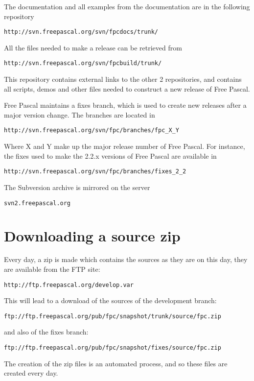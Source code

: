 The documentation and all examples from the documentation are in the
following repository
\begin{verbatim}
http://svn.freepascal.org/svn/fpcdocs/trunk/
\end{verbatim}

All the files needed to make a release can be retrieved from
\begin{verbatim}
http://svn.freepascal.org/svn/fpcbuild/trunk/
\end{verbatim}
This repository contains external links to the other 2 repositories, and
contains all scripts, demos and other files needed to construct a new
release of Free Pascal.

Free Pascal maintains a fixes branch, which is used to create new releases
after a major version change. The branches are located in 
\begin{verbatim}
http://svn.freepascal.org/svn/fpc/branches/fpc_X_Y
\end{verbatim}
Where X and Y make up the major release number of Free Pascal. 
For instance, the fixes used to make the 2.2.x versions of Free Pascal are
available in
\begin{verbatim}
http://svn.freepascal.org/svn/fpc/branches/fixes_2_2
\end{verbatim}

The Subversion archive is mirrored on the server
\begin{verbatim}
svn2.freepascal.org
\end{verbatim}

\section{Downloading a source zip}
Every day, a zip is made which contains the sources as they are on this day,
they are available from the FTP site:
\begin{verbatim}
http://ftp.freepascal.org/develop.var
\end{verbatim}
This will lead to a download of the sources of the development branch:
\begin{verbatim}
ftp://ftp.freepascal.org/pub/fpc/snapshot/trunk/source/fpc.zip
\end{verbatim}
and also of the fixes branch:
\begin{verbatim}
ftp://ftp.freepascal.org/pub/fpc/snapshot/fixes/source/fpc.zip
\end{verbatim}
The creation of the zip files is an automated process, and so these files 
are created every day.


